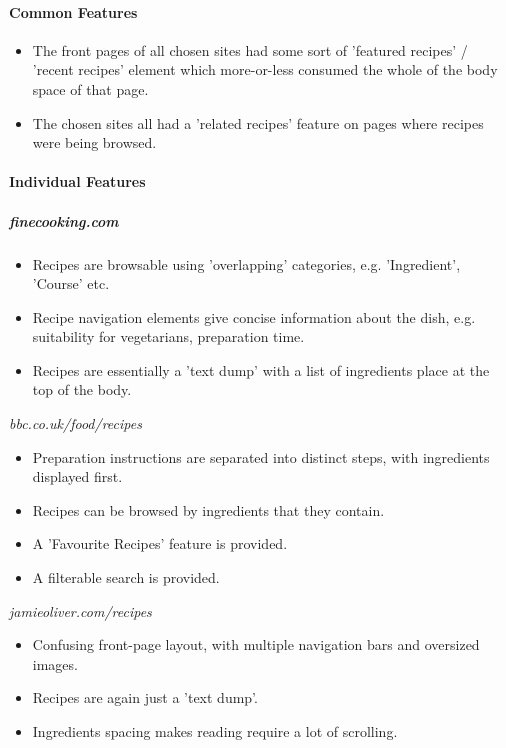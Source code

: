 \paragraph{Common Features}
\begin{itemize}
\item The front pages of all chosen sites had some sort of 'featured recipes' / 'recent recipes' element which more-or-less consumed the whole of the body space of that page. 
\item The chosen sites all had a 'related recipes' feature on pages where recipes were being browsed.
\end{itemize}

\paragraph{Individual Features}

\subparagraph{finecooking.com}
\begin{itemize}
\item Recipes are browsable using 'overlapping' categories, e.g. 'Ingredient', 'Course' etc.
\item Recipe navigation elements give concise information about the dish, e.g. suitability for vegetarians, preparation time.
\item Recipes are essentially a 'text dump' with a list of ingredients place at the top of the body.
\end{itemize}

\emph{bbc.co.uk/food/recipes}
\begin{itemize}
\item Preparation instructions are separated into distinct steps, with ingredients displayed first.
\item Recipes can be browsed by ingredients that they contain.
\item A 'Favourite Recipes' feature is provided.
\item A filterable search is provided.
\end{itemize}

\emph{jamieoliver.com/recipes}
\begin{itemize}
\item Confusing front-page layout, with multiple navigation bars and oversized images.
\item Recipes are again just a 'text dump'.
\item Ingredients spacing makes reading require a lot of scrolling.
\end{itemize}

